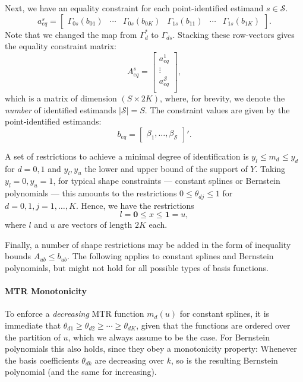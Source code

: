 \documentclass[12pt,a4paper,english]{article} %
\numberwithin{equation}{section}
\theoremstyle{definition}
\theoremstyle{remark}
\theoremstyle{plain}
\begin{document}
Next, we have an equality constraint for each point-identified estimand $s\in\mathcal{S}$.
\begin{equation*}
  a_{eq}^s =
  \begin{bmatrix}
     \Gamma_{0s}(b_{01}) & \cdots & \Gamma_{0s}(b_{0K}) & \Gamma_{1s}(b_{11}) & \cdots & \Gamma_{1s}(b_{1K})
  \end{bmatrix}.
\end{equation*}
Note that we changed the map from $\Gamma^*_d$ to $\Gamma_{ds}$. Stacking these row-vectors gives the equality constraint matrix:
\begin{equation*}
  A_{eq}^s =
  \begin{bmatrix}
    a_{eq}^1 \\
    \vdots \\
    a_{eq}^\mathcal{S} \\
  \end{bmatrix},
\end{equation*}
which is a matrix of dimension $(S\times 2K)$, where, for brevity, we denote the \textit{number} of identified estimands $|\mathcal{S}| = S$.
The constraint values are given by the point-identified estimands:
\begin{equation*}
  b_{eq} =
  \begin{bmatrix}
    \beta_1, \ldots, \beta_\mathcal{S}
  \end{bmatrix}'.
\end{equation*}


A set of restrictions to achieve a minimal degree of identification is $y_l \leq m_d \leq y_d$ for $d=0,1$ and $y_l, y_u$ the lower and upper bound of the support of $Y$.
Taking $y_l = 0, y_u=1$, for typical shape constraints --- constant splines or Bernstein polynomials --- this amounts to the restrictions $0\leq \theta_{dj} \leq 1$ for $d=0,1, j=1,\ldots,K$.
Hence, we have the restrictions
\begin{equation*}
  l = \mathbf{0} \leq x \leq \mathbf{1} = u,
\end{equation*}
where $l$ and $u$ are vectors of length $2K$ each.

Finally, a number of shape restrictions may be added in the form of inequality bounds $A_{ub} \leq b_{ub}$.
The following applies to constant splines and Bernstein polynomials, but might not hold for all possible types of basis functions.

\paragraph{MTR Monotonicity}
To enforce a \textit{decreasing} MTR function $m_d(u)$ for constant splines, it is immediate that $\theta_{d1} \geq \theta_{d2} \geq \cdots \geq \theta_{dK}$, given that the functions are ordered over the partition of $u$, which we always assume to be the case.
For Bernstein polynomials this also holds, since they obey a monotonicity property: Whenever the basis coefficients $\theta_{dk}$ are decreasing over $k$, so is the resulting Bernstein polynomial (and the same for increasing).
\end{document}
